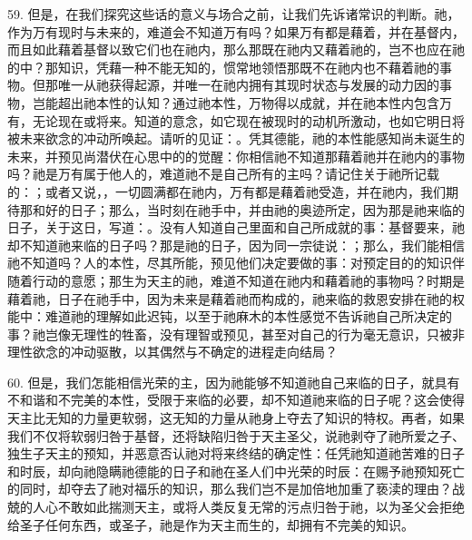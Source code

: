 59. 但是，在我们探究这些话的意义与场合之前，让我们先诉诸常识的判断。祂，作为万有现时与未来的，难道会不知道万有吗？如果万有都是藉着，并在基督内，而且如此藉着基督以致它们也在祂内，那么那既在祂内又藉着祂的，岂不也应在祂的中？那知识，凭藉一种不能无知的，惯常地领悟那既不在祂内也不藉着祂的事物。但那唯一从祂获得起源，并唯一在祂内拥有其现时状态与发展的动力因的事物，岂能超出祂本性的认知？通过祂本性，万物得以成就，并在祂本性内包含万有，无论现在或将来。知道的意念，如它现在被现时的动机所激动，也如它明日将被未来欲念的冲动所唤起。请听的见证：。凭其德能，祂的本性能感知尚未诞生的未来，并预见尚潜伏在心思中的的觉醒：你相信祂不知道那藉着祂并在祂内的事物吗？祂是万有属于他人的，难道祂不是自己所有的主吗？请记住关于祂所记载的：；或者又说，，一切圆满都在祂内，万有都是藉着祂受造，并在祂内，我们期待那和好的日子；那么，当时刻在祂手中，并由祂的奥迹所定，因为那是祂来临的日子，关于这日，写道：。没有人知道自己里面和自己所成就的事：基督要来，祂却不知道祂来临的日子吗？那是祂的日子，因为同一宗徒说：；那么，我们能相信祂不知道吗？人的本性，尽其所能，预见他们决定要做的事：对预定目的的知识伴随着行动的意愿；那生为天主的祂，难道不知道在祂内和藉着祂的事物吗？时期是藉着祂，日子在祂手中，因为未来是藉着祂而构成的，祂来临的救恩安排在祂的权能中：难道祂的理解如此迟钝，以至于祂麻木的本性感觉不告诉祂自己所决定的事？祂岂像无理性的牲畜，没有理智或预见，甚至对自己的行为毫无意识，只被非理性欲念的冲动驱散，以其偶然与不确定的进程走向结局？\par

60. 但是，我们怎能相信光荣的主，因为祂能够不知道祂自己来临的日子，就具有不和谐和不完美的本性，受限于来临的必要，却不知道祂来临的日子呢？这会使得天主比无知的力量更软弱，这无知的力量从祂身上夺去了知识的特权。再者，如果我们不仅将软弱归咎于基督，还将缺陷归咎于天主圣父，说祂剥夺了祂所爱之子、独生子天主的预知，并恶意否认祂对将来终结的确定性：任凭祂知道祂苦难的日子和时辰，却向祂隐瞒祂德能的日子和祂在圣人们中光荣的时辰：在赐予祂预知死亡的同时，却夺去了祂对福乐的知识，那么我们岂不是加倍地加重了亵渎的理由？战兢的人心不敢如此揣测天主，或将人类反复无常的污点归咎于祂，以为圣父会拒绝给圣子任何东西，或圣子，祂是作为天主而生的，却拥有不完美的知识。\par

